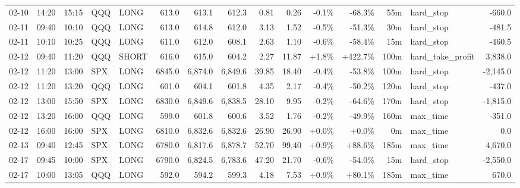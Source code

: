 \documentclass[11pt,a4paper,twoside]{article}
\begin{document}
\begin{landscape}
\begin{center}
\begin{longtable}{>{\color{txtmain}}l l l l l r r r r r r r r >{\color{txtmain}}l r}
02-10 & 14:20 & 15:15 & QQQ & LONG & 613.0 & 613.1 & 612.3 & 0.81 & 0.26 & \textcolor{lossred}{-0.1\%} & \textcolor{lossred}{-68.3\%} & 55m & hard\_stop & \textcolor{lossred}{-660.0} \\
02-11 & 09:40 & 10:10 & QQQ & LONG & 613.0 & 614.8 & 612.0 & 3.13 & 1.52 & \textcolor{lossred}{-0.5\%} & \textcolor{lossred}{-51.3\%} & 30m & hard\_stop & \textcolor{lossred}{-481.5} \\
02-11 & 10:10 & 10:25 & QQQ & LONG & 611.0 & 612.0 & 608.1 & 2.63 & 1.10 & \textcolor{lossred}{-0.6\%} & \textcolor{lossred}{-58.4\%} & 15m & hard\_stop & \textcolor{lossred}{-460.5} \\
02-12 & 09:40 & 11:20 & QQQ & SHORT & 616.0 & 615.0 & 604.2 & 2.27 & 11.87 & \textcolor{wingreen}{+1.8\%} & \textcolor{wingreen}{+422.7\%} & 100m & hard\_take\_profit & \textcolor{wingreen}{3,838.0} \\
02-12 & 11:20 & 13:00 & SPX & LONG & 6845.0 & 6,874.0 & 6,849.6 & 39.85 & 18.40 & \textcolor{lossred}{-0.4\%} & \textcolor{lossred}{-53.8\%} & 100m & hard\_stop & \textcolor{lossred}{-2,145.0} \\
02-12 & 11:20 & 13:20 & QQQ & LONG & 601.0 & 604.1 & 601.8 & 4.35 & 2.17 & \textcolor{lossred}{-0.4\%} & \textcolor{lossred}{-50.2\%} & 120m & hard\_stop & \textcolor{lossred}{-437.0} \\
02-12 & 13:00 & 15:50 & SPX & LONG & 6830.0 & 6,849.6 & 6,838.5 & 28.10 & 9.95 & \textcolor{lossred}{-0.2\%} & \textcolor{lossred}{-64.6\%} & 170m & hard\_stop & \textcolor{lossred}{-1,815.0} \\
02-12 & 13:20 & 16:00 & QQQ & LONG & 599.0 & 601.8 & 600.6 & 3.52 & 1.76 & \textcolor{lossred}{-0.2\%} & \textcolor{lossred}{-49.9\%} & 160m & max\_time & \textcolor{lossred}{-351.0} \\
02-12 & 16:00 & 16:00 & SPX & LONG & 6810.0 & 6,832.6 & 6,832.6 & 26.90 & 26.90 & \textcolor{wingreen}{+0.0\%} & \textcolor{wingreen}{+0.0\%} & 0m & max\_time & \textcolor{wingreen}{0.0} \\
02-13 & 09:40 & 12:45 & SPX & LONG & 6780.0 & 6,817.6 & 6,878.7 & 52.70 & 99.40 & \textcolor{wingreen}{+0.9\%} & \textcolor{wingreen}{+88.6\%} & 185m & max\_time & \textcolor{wingreen}{4,670.0} \\
02-17 & 09:45 & 10:00 & SPX & LONG & 6790.0 & 6,824.5 & 6,783.6 & 47.20 & 21.70 & \textcolor{lossred}{-0.6\%} & \textcolor{lossred}{-54.0\%} & 15m & hard\_stop & \textcolor{lossred}{-2,550.0} \\
02-17 & 10:00 & 13:05 & QQQ & LONG & 592.0 & 594.2 & 599.3 & 4.18 & 7.53 & \textcolor{wingreen}{+0.9\%} & \textcolor{wingreen}{+80.1\%} & 185m & max\_time & \textcolor{wingreen}{670.0} \\

\end{longtable}
\end{center}
\end{landscape}
\end{document}

